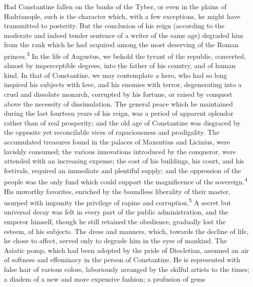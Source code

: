 
Had Constantine fallen on the banks of the Tyber, or even in the
plains of Hadrianople, such is the character which, with a few
exceptions, he might have transmitted to posterity. But the
conclusion of his reign (according to the moderate and indeed
tender sentence of a writer of the same age) degraded him from
the rank which he had acquired among the most deserving of the
Roman princes.\textsuperscript{3} In the life of Augustus, we behold the tyrant of
the republic, converted, almost by imperceptible degrees, into
the father of his country, and of human kind. In that of
Constantine, we may contemplate a hero, who had so long inspired
his subjects with love, and his enemies with terror, degenerating
into a cruel and dissolute monarch, corrupted by his fortune, or
raised by conquest above the necessity of dissimulation. The
general peace which he maintained during the last fourteen years
of his reign, was a period of apparent splendor rather than of
real prosperity; and the old age of Constantine was disgraced by
the opposite yet reconcilable vices of rapaciousness and
prodigality. The accumulated treasures found in the palaces of
Maxentius and Licinius, were lavishly consumed; the various
innovations introduced by the conqueror, were attended with an
increasing expense; the cost of his buildings, his court, and his
festivals, required an immediate and plentiful supply; and the
oppression of the people was the only fund which could support
the magnificence of the sovereign.\textsuperscript{4} His unworthy favorites,
enriched by the boundless liberality of their master, usurped
with impunity the privilege of rapine and corruption.\textsuperscript{5} A secret
but universal decay was felt in every part of the public
administration, and the emperor himself, though he still retained
the obedience, gradually lost the esteem, of his subjects. The
dress and manners, which, towards the decline of life, he chose
to affect, served only to degrade him in the eyes of mankind. The
Asiatic pomp, which had been adopted by the pride of Diocletian,
assumed an air of softness and effeminacy in the person of
Constantine. He is represented with false hair of various colors,
laboriously arranged by the skilful artists to the times; a
diadem of a new and more expensive fashion; a profusion of gems
